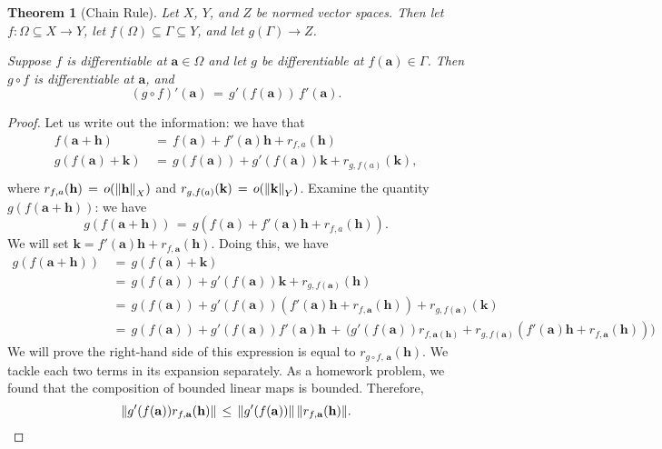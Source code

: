 \documentclass[11pt]{article}
\newtheorem{theorem}{Theorem}
\renewcommand{\vec}[1]{\mathbf{#1}}
\begin{document}
\begin{adjustwidth}{0.5cm}{}
  \begin{theorem}[Chain Rule]
    Let $X$, $Y$, and $Z$ be normed vector spaces. Then let $f : \Omega \subseteq X \to Y$, let $f(\Omega) \subseteq \Gamma \subseteq Y$, and let $g(\Gamma) \to Z$. 

    Suppose $f$ is differentiable at $\vec{a} \in \Omega$ and let $g$ be differentiable at $f(\vec{a}) \in \Gamma$. Then $g \circ f$ is differentiable at $\vec{a}$, and
    \[
      (g \circ f)'(\vec{a}) \, = \, g'(f(\vec{a})) \, f'(\vec{a}).
    \]
  \end{theorem}
  \begin{proof}
    Let us write out the information: we have that
    \begin{align*}
      f(\vec{a} + \vec{h}) \, &= \, f(\vec{a}) + f'(\vec{a}) \vec{h} + r_{f, a}(\vec{h}) \\
      g(f(\vec{a}) + \vec{k}) \, &= \,  g(f(\vec{a})) + g'(f(\vec{a})) \vec{k} + r_{g, f(a)}(\vec{k}), \\
    \end{align*}
    where $r_{f, a}(\vec{h}) \, = \, o(\norm{\vec{h}}_{X})$ and $r_{g, f(a)}(\vec{k}) \, = \, o(\norm{\vec{k}}_{Y})$. Examine the quantity $g(f(\vec{a} + \vec{h}))$: we have
    \[
      g(f(\vec{a} + \vec{h})) \, = \, g(f(\vec{a}) + f'(\vec{a}) \vec{h} + r_{f, a}(\vec{h})).
    \]
    We will set $\vec{k} = f'(\vec{a})\vec{h} + r_{f, \vec{a}}(\vec{h})$. Doing this, we have
    \begin{align*}
      g(f(\vec{a} + \vec{h})) \, &= \, g(f(\vec{a}) + \vec{k}) \\
                                 &= \, g(f(\vec{a})) + g'(f(\vec{a})) \vec{k} + r_{g, f(\vec{a})}(\vec{h}) \\
                                 &= \, g(f(\vec{a})) + g'(f(\vec{a})) \left( f'(\vec{a}) \vec{h} + r_{f, \vec{a}}(\vec{h}) \right) + r_{g, f(\vec{a})}(\vec{k}) \\
                                 &= \, g(f(\vec{a})) + g'(f(\vec{a})) f'(\vec{a}) \vec{h} \, + \, \big(   g'(f(\vec{a}))r_{f, \vec{a}(\vec{h})} + r_{g, f(\vec{a})}(f'(\vec{a})\vec{h} + r_{f, \vec{a}}(\vec{h})) \big)
    \end{align*} 
    We will prove the right-hand side of this expression is equal to $r_{g \circ f, \, \vec{a}}(\vec{h})$. We tackle each two terms in its expansion separately. As a homework problem, we found that the composition of bounded linear maps is bounded. Therefore,
    \[
      \norm{g'(f(\vec{a})) r_{f, \vec{a}}(\vec{h})} \, \le \, \norm{g'(f(\vec{a}))} \, \norm{r_{f, \vec{a}}(\vec{h})}.
\]
\end{proof}
\end{adjustwidth}
\end{document}
